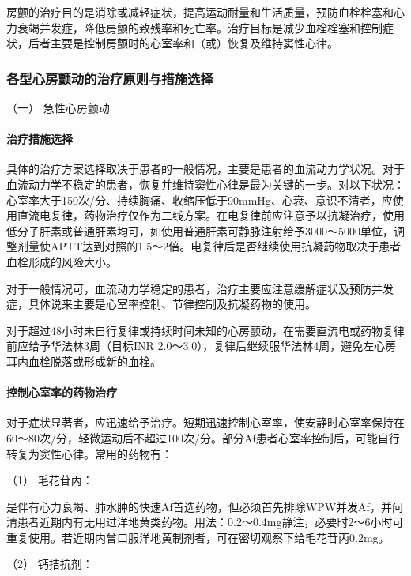 房颤的治疗目的是消除或减轻症状，提高运动耐量和生活质量，预防血栓栓塞和心力衰竭并发症，降低房颤的致残率和死亡率。治疗目标是减少血栓栓塞和控制症状，后者主要是控制房颤时的心室率和（或）恢复及维持窦性心律。

\subsubsection{各型心房颤动的治疗原则与措施选择}

\hypertarget{text00291.htmlux5cux23CHP10-2-4-3-1-1}{}
（一） 急性心房颤动

\paragraph{治疗措施选择}

具体的治疗方案选择取决于患者的一般情况，主要是患者的血流动力学状况。对于血流动力学不稳定的患者，恢复并维持窦性心律是最为关键的一步。对以下状况：心室率大于150次/分、持续胸痛、收缩压低于90mmHg、心衰、意识不清者，应使用直流电复律，药物治疗仅作为二线方案。在电复律前应注意予以抗凝治疗，使用低分子肝素或普通肝素均可，如使用普通肝素可静脉注射给予3000～5000单位，调整剂量使APTT达到对照的1.5～2倍。电复律后是否继续使用抗凝药物取决于患者血栓形成的风险大小。

对于一般情况可，血流动力学稳定的患者，治疗主要应注意缓解症状及预防并发症，具体说来主要是心室率控制、节律控制及抗凝药物的使用。

对于超过48小时未自行复律或持续时间未知的心房颤动，在需要直流电或药物复律前应给予华法林3周（目标INR
2.0～3.0），复律后继续服华法林4周，避免左心房耳内血栓脱落或形成新的血栓。

\paragraph{控制心室率的药物治疗}

对于症状显著者，应迅速给予治疗。短期迅速控制心室率，使安静时心室率保持在60～80次/分，轻微运动后不超过100次/分。部分Af患者心室率控制后，可能自行转复为窦性心律。常用的药物有：

\hypertarget{text00291.htmlux5cux23CHP10-2-4-3-1-1-2-1}{}
（1） 毛花苷丙：

是伴有心力衰竭、肺水肿的快速Af首选药物，但必须首先排除WPW并发Af，并问清患者近期内有无用过洋地黄类药物。用法：0.2～0.4mg静注，必要时2～6小时可重复使用。若近期内曾口服洋地黄制剂者，可在密切观察下给毛花苷丙0.2mg。

\hypertarget{text00291.htmlux5cux23CHP10-2-4-3-1-1-2-2}{}
（2） 钙拮抗剂：

